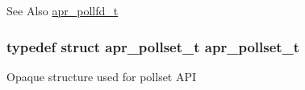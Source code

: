 \begin{DoxySeeAlso}{See Also}
\hyperlink{structapr__pollfd__t}{apr\-\_\-pollfd\-\_\-t} 
\end{DoxySeeAlso}
\hypertarget{group__apr__poll_ga680da1f10ac5ef75efc503a9d15b8906}{
\subsubsection[{apr\-\_\-pollset\-\_\-t}]{\setlength{\rightskip}{0pt plus 5cm}typedef struct {\bf apr\-\_\-pollset\-\_\-t} {\bf apr\-\_\-pollset\-\_\-t}}}\label{group__apr__poll_ga680da1f10ac5ef75efc503a9d15b8906}
Opaque structure used for pollset A\-P\-I 

